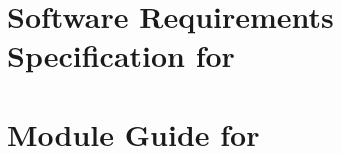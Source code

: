 \documentclass[12pt]{report} %
\numberwithin{equation}{section} %
\begin{document}
   

\beforepreface %
  
\afterpreface
  
  
                    
        \setcounter{figure}{0}
        \setcounter{equation}{0}
        \setcounter{table}{0}
        
                    
       \setcounter{figure}{0}
       \setcounter{equation}{0}
       \setcounter{table}{0}

                    
       \setcounter{figure}{0}
       \setcounter{equation}{0}
       \setcounter{table}{0}

  
        \setcounter{figure}{0}
        \setcounter{equation}{0}
        \setcounter{table}{0}




\begin{appendix}
\chapter{Software Requirements Specification for \progname{}}\label{SRS}

\chapter{Module Guide for \progname{}}\label{MG}

%    

%    
\end{appendix}



\label{NumDocumentPages}
\end{document}

